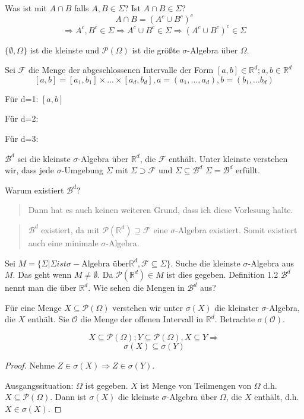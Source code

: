 Was ist mit $A \cap B$ falls $A,B \in \Sigma$? Ist $A \cap B \in \Sigma$?
$$ A \cap B = (A^c \cup B^c)^c$$
$$ \Rightarrow A^c, B^c \in \Sigma \Rightarrow A^c \cup B^c \in \Sigma \Rightarrow (A^c \cup B^c)^c \in \Sigma $$

$\{\emptyset, \Omega\}$ ist die kleinste und $\mathcal P(\Omega)$ ist die größte $\sigma$-Algebra über $\Omega$.
\begin{example}
Sei $\mathcal F$ die Menge der abgeschlossenen Intervalle der Form $[a,b] \in \mathbb R^d; a,b \in \mathbb R^d$
$$ [a,b]=[a_1,b_1] \times ... \times [a_d,b_d], a=(a_1,...,a_d), b=(b_1	,...b_d)$$

Für d=1: $[a,b]$

Für d=2: 

Für d=3: 

\end{example}
$\mathcal B^d$ sei die kleinste $\sigma$-Algebra über $\mathbb R^d$, die $\mathcal F$ enthält. Unter kleinste verstehen wir, dass jede $\sigma$-Umgebung $\Sigma$ mit $\Sigma \supset \mathcal F$ und $\Sigma \subseteq \mathcal{B}^d$ $\Sigma = \mathcal{B}^d$ erfüllt.

Warum existiert $\mathcal{B}^d$?
\begin{quote}
 Dann hat es auch keinen weiteren Grund, dass ich diese Vorlesung halte.
\end{quote}
\begin{quote}
 $\mathcal{B}^d$ existiert, da mit $\mathcal P(\mathbb R^d) \supseteq \mathcal F$ eine $\sigma$-Algebra existiert. Somit existiert auch eine minimale $\sigma$-Algebra.
\end{quote}
Sei $M=\{\Sigma | \Sigma ist \sigma-\textrm{Algebra über} \mathbb R^d, \mathcal F \subseteq \Sigma\}$.
Suche die kleinste $\sigma$-Algebra aus $M$. Das geht wenn $M \neq \emptyset$. Da $\mathcal P(\mathbb R^d) \in M$ ist dies gegeben.
Definition 1.2 $\mathcal B^d$ nennt man die  über $\mathbb{R}^d$.
Wie sehen die Mengen in $\mathcal B^d$ aus?

Für eine Menge $X \subseteq \mathcal P(\Omega)$ verstehen wir unter $\sigma(X)$ die kleinster $\sigma$-Algebra, die $X$ enthält. Sie $\mathcal O$ die Menge der offenen Intervall in $\mathbb R^d$. Betrachte $\sigma(\mathcal O)$.

\begin{theorem}
$$ X \subseteq \mathcal P(\Omega); Y \subseteq \mathcal P(\Omega), X \subseteq Y \Rightarrow$$
$$ \sigma(X) \subseteq \sigma(Y)$$
\end{theorem}
\begin{proof}
Nehme $Z \in \sigma(X) \Rightarrow Z \in \sigma(Y)$.

Ausgangssituation:
$\Omega$ ist gegeben. $X$ ist Menge von Teilmengen von $\Omega$ d.h. $X \subseteq \mathcal P(\Omega)$.
Dann ist $\sigma(X)$ die kleinste $\sigma$-Algebra über $\Omega$, die $X$ enthält, d.h. $X \in \sigma(X)$.
\end{proof}

